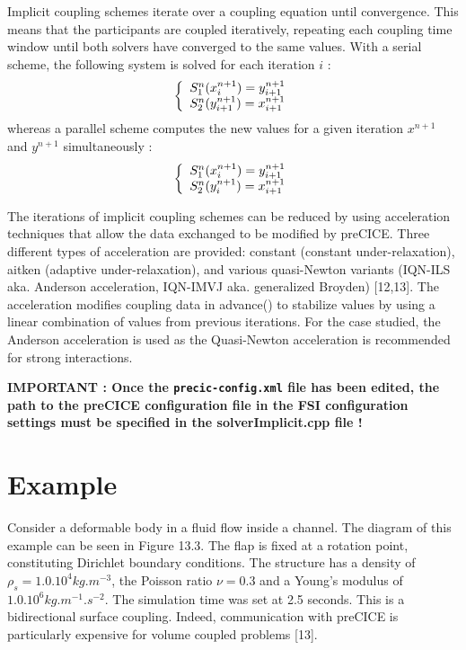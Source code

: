 \documentclass[oneside,11pt,times]{book}
\begin{document}
Implicit coupling schemes iterate over a coupling equation until convergence. This means that the participants are coupled iteratively, repeating each coupling time window until both solvers have converged to the same values. With a serial scheme, the following system is solved for each iteration $i$ :
\begin{equation}
    \left\{
        \begin{array}{r c l}
        S_1^n(x^{n+1}_i) = y^{n+1}_{i+1}\\
        S_2^n(y^{n+1}_{i+1}) = x^{n+1}_{i+1}
        \end{array}
        \right.
\end{equation}
whereas a parallel scheme computes the new values for a given iteration $x^{n+1}$ and $y^{n+1}$ simultaneously :
\begin{equation}
    \left\{
        \begin{array}{r c l}
        S_1^n(x^{n+1}_i) = y^{n+1}_{i+1}\\
        S_2^n(y^{n+1}_{i}) = x^{n+1}_{i+1}
        \end{array}
        \right.
\end{equation}

The iterations of implicit coupling schemes can be reduced by using acceleration techniques that allow the data exchanged to be modified by preCICE. Three different types of acceleration are provided: constant (constant under-relaxation), aitken (adaptive under-relaxation), and various quasi-Newton variants (IQN-ILS aka. Anderson acceleration, IQN-IMVJ aka. generalized Broyden) [12,13]. The acceleration modifies coupling data in advance() to stabilize values by using a linear combination of values from previous iterations. For the case studied, the Anderson acceleration is used as the Quasi-Newton acceleration is recommended for strong interactions.

\textbf{IMPORTANT : Once the \texttt{precic-config.xml} file has been edited, the path to the preCICE configuration file in the FSI configuration settings must be specified in the \textbf{solverImplicit.cpp} file !}

\section{Example}


Consider a deformable body in a fluid flow inside a channel. The diagram of this example can be seen in Figure 13.3. The flap is fixed at a rotation point, constituting Dirichlet boundary conditions. The structure has a density of $\rho_s = 1.0.10^4 kg.m^{-3}$, the Poisson ratio $\nu = 0.3$ and a Young's modulus of $1.0.10^6 kg.m^{-1}.s^{-2}$. The simulation time was set at 2.5 seconds.  This is a bidirectional surface coupling. Indeed, communication with preCICE is particularly expensive for volume coupled problems [13].\\
\end{document}
